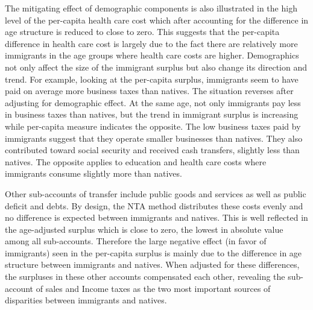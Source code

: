 \vspace{0.7em}\par
The mitigating effect of demographic components is also illustrated in the high level of the per-capita health care cost which after accounting for the difference in age structure is reduced to close to zero.
This suggests that the per-capita difference in health care cost is largely due to the fact there are relatively more immigrants in the age groups where health care costs are higher.
Demographics not only affect the size of the immigrant surplus but also change its direction and trend.
For example, looking at the per-capita surplus, immigrants seem to have paid on average more business taxes than natives.
The situation reverses after adjusting for demographic effect.
At the same age, not only immigrants pay less in business taxes than natives, but the trend in immigrant surplus is increasing while per-capita measure indicates the opposite.
The low business taxes paid by immigrants suggest that they operate smaller businesses than natives.
They also contributed toward social security and received cash transfers, slightly less than natives.
The opposite applies to education and health care costs where immigrants consume slightly more than natives.

\vspace{0.7em}\par
Other sub-accounts of transfer include public goods and services as well as public deficit and debts.
By design, the NTA method distributes these costs evenly and no difference is expected between immigrants and natives.
This is well reflected in the age-adjusted surplus which is close to zero, the lowest in absolute value among all sub-accounts.
Therefore the large negative effect (in favor of immigrants) seen in the per-capita surplus is mainly due to the difference in age structure between immigrants and natives.
When adjusted for these differences, the surpluses in these other accounts compensated each other, revealing the sub-account of sales and Income taxes as the two most important sources of disparities between immigrants and natives.

